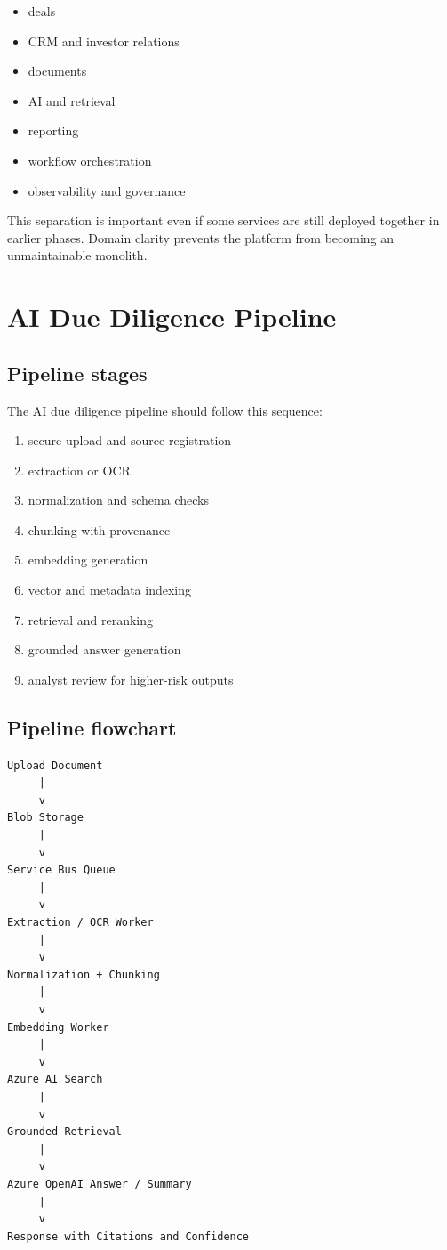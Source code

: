 \documentclass[11pt]{article}
\begin{document}
\begin{itemize}
\item deals
\item CRM and investor relations
\item documents
\item AI and retrieval
\item reporting
\item workflow orchestration
\item observability and governance
\end{itemize}

This separation is important even if some services are still deployed together in earlier phases. Domain clarity prevents the platform from becoming an unmaintainable monolith.

\section{AI Due Diligence Pipeline}

\subsection{Pipeline stages}

The AI due diligence pipeline should follow this sequence:

\begin{enumerate}
\item secure upload and source registration
\item extraction or OCR
\item normalization and schema checks
\item chunking with provenance
\item embedding generation
\item vector and metadata indexing
\item retrieval and reranking
\item grounded answer generation
\item analyst review for higher-risk outputs
\end{enumerate}

\subsection{Pipeline flowchart}

\begin{verbatim}
Upload Document
     |
     v
Blob Storage
     |
     v
Service Bus Queue
     |
     v
Extraction / OCR Worker
     |
     v
Normalization + Chunking
     |
     v
Embedding Worker
     |
     v
Azure AI Search
     |
     v
Grounded Retrieval
     |
     v
Azure OpenAI Answer / Summary
     |
     v
Response with Citations and Confidence
\end{verbatim}
\end{document}
